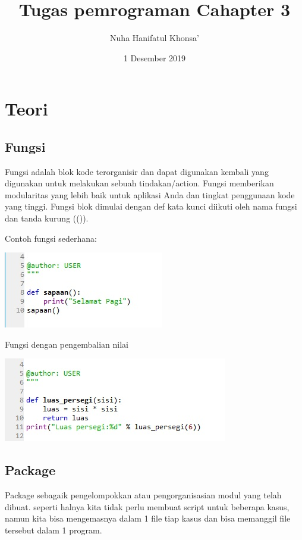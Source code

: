 \documentclass[a4paper,12pt]{report}
\title{Tugas pemrograman Cahapter 3}
\author{Nuha Hanifatul Khonsa'}
\date{1 Desember 2019}
\begin{document}
\maketitle


\section{Teori}
\subsection{Fungsi}
\par Fungsi adalah blok kode terorganisir dan dapat digunakan kembali yang digunakan untuk melakukan sebuah tindakan/action. Fungsi memberikan modularitas yang lebih baik untuk aplikasi Anda dan tingkat penggunaan kode yang tinggi. Fungsi blok dimulai dengan def kata kunci diikuti oleh nama fungsi dan tanda kurung (()).

Contoh fungsi sederhana:
    \begin{center}
    \includegraphics[width=11cm\textwidth]{Figure/fungsi1.jpg}
    \end{center}
Fungsi dengan pengembalian nilai
    \begin{center}
    \includegraphics[width=11cm\textwidth]{Figure/fungsi2.jpg}
    \end{center}
    
\subsection{Package}
\par  Package sebagaik pengelompokkan atau pengorganisasian modul yang telah dibuat. seperti halnya  kita tidak perlu membuat script untuk beberapa kasus, namun kita bisa mengemasnya dalam 1 file tiap kasus dan bisa memanggil file tersebut dalam 1 program.
\end{document}
